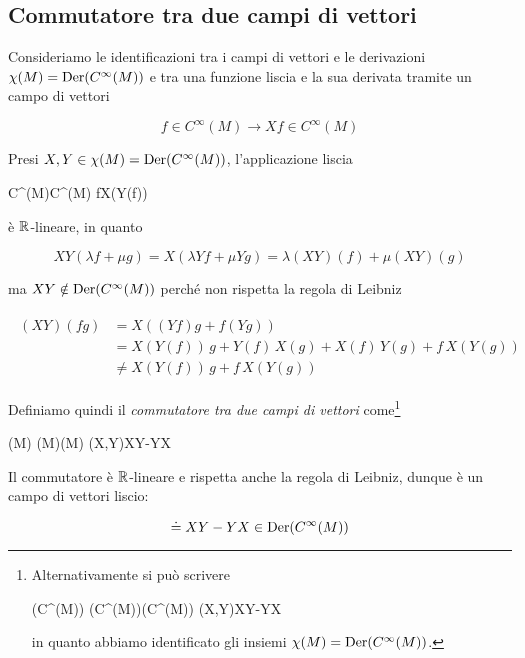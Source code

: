 \subsection{Commutatore tra due campi di vettori}

Consideriamo le identificazioni tra i campi di vettori e le derivazioni $ \chi(M) = \operatorname{Der}(C^{\infty}(M)) $ e tra una funzione liscia e la sua derivata tramite un campo di vettori

\begin{equation}
	f \in C^{\infty}(M) \to X f \in C^{\infty}(M)
\end{equation}

Presi $ X,Y \in \chi(M) = \operatorname{Der}(C^{\infty}(M)) $, l'applicazione liscia

	{C^{\infty}(M)}{C^{\infty}(M)}
	{f}{X(Y(f))}

è $ \mathbb{R} $-lineare, in quanto

\begin{equation}
	X Y (\lambda f + \mu g) = X (\lambda Y f + \mu Y g) %
	= \lambda (XY)(f) + \mu (XY)(g)
\end{equation}

ma $ XY \notin \operatorname{Der}(C^{\infty}(M)) $ perché non rispetta la regola di Leibniz

\begin{align}
	\begin{split}
		(XY)(fg) &= X ((Yf) g + f (Y g)) \\
		&= X(Y(f)) \, g + Y(f) \, X(g) + X(f) \, Y(g) + f \, X(Y(g)) \\
		&\neq X(Y(f)) \, g + f \, X(Y(g))
	\end{split}
\end{align}

Definiamo quindi il \textit{commutatore tra due campi di vettori} come\footnote{%
	Alternativamente si può scrivere
	
	\maps{[\cdot,\cdot]}
		{\der(C^{\infty}(M)) \times \der(C^{\infty}(M))}{\der(C^{\infty}(M))}
		{(X,Y)}{XY-YX}
	
	in quanto abbiamo identificato gli insiemi $ \chi(M) = \operatorname{Der}(C^{\infty}(M)) $.%
}

\map{[\cdot,\cdot]}
	{\chi(M) \times \chi(M)}{\chi(M)}
	{(X,Y)}{XY-YX}

Il commutatore è $ \mathbb{R} $-lineare e rispetta anche la regola di Leibniz, dunque è un campo di vettori liscio:

\begin{equation}
	[X,Y] \doteq XY-YX \in \der(C^{\infty}(M))
\end{equation}

